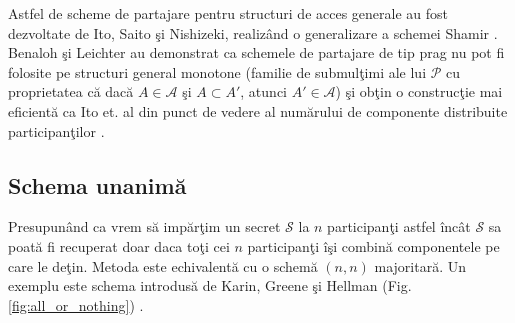 \documentclass{llncs}
\begin{document}
Astfel de scheme de partajare pentru structuri de acces generale au fost dezvoltate de Ito, Saito \c{s}i Nishizeki, realiz\^{a}nd o generalizare a schemei Shamir \cite{ITO:1989}.
Benaloh \c{s}i Leichter au demonstrat ca schemele de partajare de tip prag nu pot fi folosite pe structuri general monotone (familie de submul\c{t}imi ale lui $\mathcal{P}$ cu proprietatea c\u{a} dac\u{a} $A \in \mathcal{A}$ \c{s}i $A \subset A'$, atunci $A' \in \mathcal{A}$) \c{s}i ob\c{t}in o construc\c{t}ie mai eficient\u{a} ca Ito et. al din punct de vedere al num\u{a}rului de componente distribuite participan\c{t}ilor \cite{JJ:1990}.


\subsection{Schema unanim\u{a}}

Presupun\^{a}nd ca vrem s\u{a} imp\u{a}r\c{t}im un secret $\mathcal{S}$ la $n$ participan\c{t}i astfel \^{i}nc\^{a}t $\mathcal{S}$ sa poat\u{a} fi recuperat doar daca to\c{t}i cei $n$ participan\c{t}i \^{i}\c{s}i combin\u{a} componentele pe care le de\c{t}in. Metoda este echivalent\u{a} cu o schem\u{a} $(n, n)$ majoritar\u{a}. Un exemplu este schema introdus\u{a} de Karin, Greene \c{s}i Hellman (Fig.\ref{fig:all_or_nothing})  \cite{Karnin:83}.
\end{document}
